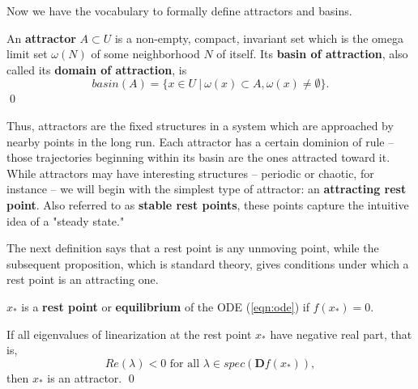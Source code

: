 Now we have the vocabulary to formally define attractors and basins.

\begin{definition}
	An \textbf{attractor} $A \subset U$ is a non-empty, compact, invariant set which is the omega limit set $\omega(N)$ of some neighborhood $N$ of itself. Its \textbf{basin of attraction}, also called its \textbf{domain of attraction}, is $$basin(A) = \{x \in U ~|~ \omega(x) \subset A, \omega(x) \neq \emptyset\}.$$ \qed
\end{definition}

Thus, attractors are the fixed structures in a system which are approached by nearby points in the long run. Each attractor has a certain dominion of rule -- those trajectories beginning within its basin are the ones attracted toward it. While attractors may have interesting structures -- periodic or chaotic, for instance -- we will begin with the simplest type of attractor: an \textbf{attracting rest point}. Also referred to as \textbf{stable rest points}, these points capture the intuitive idea of a "steady state." 


The next definition says that a rest point is any unmoving point, while the subsequent proposition, which is standard theory, gives conditions under which a rest point is an attracting one. 

\begin{definition}
	$x_\ast$ is a \textbf{rest point} or \textbf{equilibrium} of the ODE (\ref{eqn:ode}) if $f(x_\ast) = 0$.
\end{definition}


\begin{proposition}
	If all eigenvalues of linearization at the rest point $x_{\ast}$ have negative real part, that is, $$Re(\lambda) < 0 \text{ for all } \lambda \in spec(\textbf{D}f(x_\ast)),$$ 
then $x_{\ast}$ is an attractor. %
\qed
\end{proposition}

